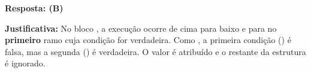 \ifmostrarGabarito
\textbf{Resposta: (B)}

\textbf{Justificativa:}
No bloco , a execução ocorre de cima para baixo e para no \textbf{primeiro} ramo cuja condição for verdadeira. Como , a primeira condição () é falsa, mas a segunda () é verdadeira. O valor  é atribuído e o restante da estrutura é ignorado.

\fi
